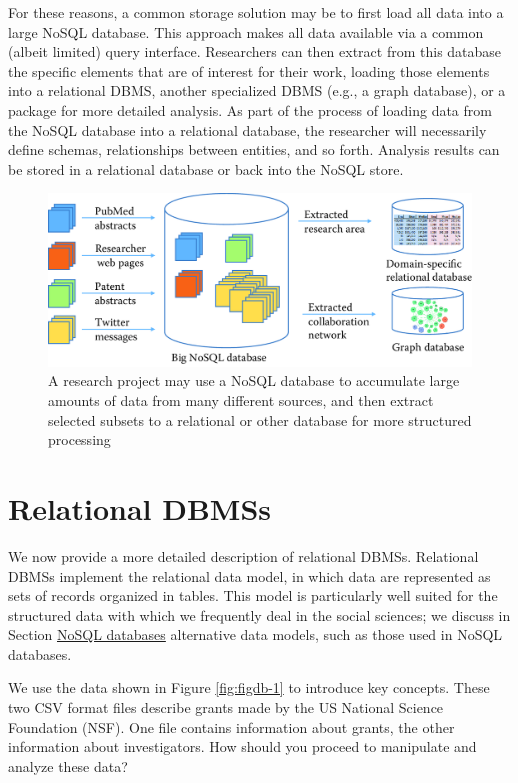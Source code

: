 \documentclass[]{krantz}
\begin{document}
For these reasons, a common storage solution may be to first load all
data into a large NoSQL database. This approach makes all data available
via a common (albeit limited) query interface. Researchers can then
extract from this database the specific elements that are of interest
for their work, loading those elements into a relational DBMS, another
specialized DBMS (e.g., a graph database), or a package for more
detailed analysis. As part of the process of loading data from the NoSQL
database into a relational database, the researcher will necessarily
define schemas, relationships between entities, and so forth. Analysis
results can be stored in a relational database or back into the NoSQL
store.

\begin{figure}

{\centering \includegraphics[width=0.7\linewidth]{ChapterDB/figures/data-fig2} 

}

\caption{A research project may use a NoSQL database to accumulate large amounts of data from many different sources, and then extract selected subsets to a relational or other database for more structured processing}\label{fig:figdb-dbs}
\end{figure}

\section{Relational DBMSs}\label{relational-dbmss}

We now provide a more detailed description of relational DBMSs.
Relational DBMSs implement the relational data model, in which data are
represented as sets of records organized in tables. This model is
particularly well suited for the structured data with which we
frequently deal in the social sciences; we discuss in Section
\protect\hyperlink{sec:db:nosql}{NoSQL databases} alternative data
models, such as those used in NoSQL databases.

We use the data shown in Figure \ref{fig:figdb-1} to introduce key
concepts. These two CSV format files describe grants made by the US
National Science Foundation (NSF). One file contains information about
grants, the other information about investigators. How should you
proceed to manipulate and analyze these data?
\end{document}
